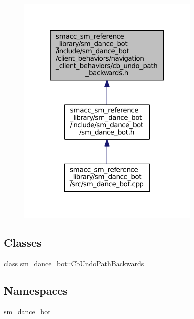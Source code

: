 \begin{figure}[H]
\begin{center}
\leavevmode
\includegraphics[width=250pt]{smacc__sm__reference__library_2sm__dance__bot_2include_2sm__dance__bot_2client__behaviors_2navigb12f011ef4dfd1a1f26c6f6bd3c1bca6}
\end{center}
\end{figure}
\subsection*{Classes}
\begin{DoxyCompactItemize}
\item 
class \hyperlink{classsm__dance__bot_1_1CbUndoPathBackwards}{sm\+\_\+dance\+\_\+bot\+::\+Cb\+Undo\+Path\+Backwards}
\end{DoxyCompactItemize}
\subsection*{Namespaces}
\begin{DoxyCompactItemize}
\item 
 \hyperlink{namespacesm__dance__bot}{sm\+\_\+dance\+\_\+bot}
\end{DoxyCompactItemize}
